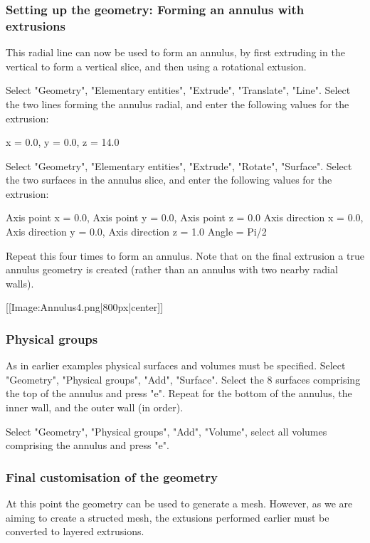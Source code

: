 \subsubsection{Setting up the geometry: Forming an annulus with extrusions}

This radial line can now be used to form an annulus, by first extruding in the vertical to form a vertical slice, and then using a rotational extusion.

Select "Geometry", "Elementary entities", "Extrude", "Translate", "Line". Select the two lines forming the annulus radial, and enter the following values for the extrusion:

x = 0.0, y = 0.0, z = 14.0


Select "Geometry", "Elementary entities", "Extrude", "Rotate", "Surface". Select the two surfaces in the annulus slice, and enter the following values for the extrusion:

Axis point x = 0.0, Axis point y = 0.0, Axis point z = 0.0
Axis direction x = 0.0, Axis direction y = 0.0, Axis direction z = 1.0
Angle = Pi/2

Repeat this four times to form an annulus. Note that on the final extrusion a true annulus geometry is created (rather than an annulus with two nearby radial walls).


[[Image:Annulus4.png|800px|center]]

\subsubsection{Physical groups}

As in earlier examples physical surfaces and volumes must be specified. Select "Geometry", "Physical groups", "Add", "Surface". Select the 8 surfaces comprising the top of the annulus and press "e". Repeat for the bottom of the annulus, the inner wall, and the outer wall (in order).


Select "Geometry", "Physical groups", "Add", "Volume", select all volumes comprising the annulus and press "e".

\subsubsection{Final customisation of the geometry}

At this point the geometry can be used to generate a mesh. However, as we are aiming to create a structed mesh, the extusions performed earlier must be converted to layered extrusions.

